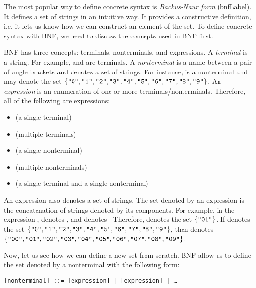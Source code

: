 The most popular way to define concrete syntax is \textit{Backus-Naur
form} (\acrshort{bnfLabel}). It defines a set of strings
in an intuitive way. It provides a constructive definition, i.e. it lets us know
how we can construct an element of the set. To define concrete syntax with BNF,
we need to discuss the concepts used in BNF first.

BNF has three concepts: terminals, nonterminals, and expressions. A
\textit{terminal} is a string. For example,  and
 are terminals. A \textit{nonterminal} is a name
between a pair of angle brackets and denotes a set of strings. For instance,
 is a nonterminal and may denote the set
$\{\texttt{"0"},\texttt{"1"},\texttt{"2"},\texttt{"3"},\texttt{"4"},\texttt{"5"},\texttt{"6"},\texttt{"7"},\texttt{"8"},\texttt{"9"}\}$.
An \textit{expression} is an enumeration of one or more
terminals/nonterminals. Therefore, all of the following are expressions:

\begin{itemize}
  \item {} (a single terminal)
  \item {}  (multiple terminals)
  \item {} (a single nonterminal)
  \item {}  (multiple nonterminals)
  \item {}  (a single terminal and a single nonterminal)
\end{itemize}

An expression also denotes a set of strings. The set denoted by an expression is
the concatenation of strings denoted by its components. For example, in the
expression  ,  denotes , and 
denotes . Therefore,   denotes the set $\{
  \texttt{"01"} \}$. If  denotes the set
$\{\texttt{"0"},\texttt{"1"},\texttt{"2"},\texttt{"3"},\texttt{"4"},\texttt{"5"},\texttt{"6"},\texttt{"7"},\texttt{"8"},\texttt{"9"}\}$,
then   denotes
$\{\texttt{"00"},\texttt{"01"},\texttt{"02"},\texttt{"03"},\texttt{"04"},\texttt{"05"},\texttt{"06"},\texttt{"07"},\texttt{"08"},\texttt{"09"}\}$.

Now, let us see how we can define a new set from scratch. BNF allow us to define
the set denoted by a nonterminal with the following form:

\begin{verbatim}
[nonterminal] ::= [expression] | [expression] | …
\end{verbatim}

